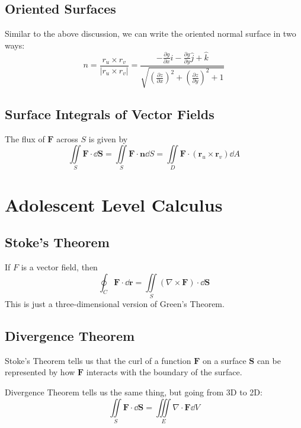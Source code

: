 \documentclass{article}
\begin{document}
\subsection{Oriented Surfaces}
Similar to the above discussion, we can write the oriented normal surface in two ways: 
\begin{equation}
    n =\frac{r_u \times r_v}{|r_u \times r_v|} = \frac{-\frac{\partial g}{\partial x} \hat{i} - \frac{\partial g}{\partial y}\hat{j} + \hat{k}}{\sqrt{\left(\frac{\partial z}{\partial x}\right)^2+\left(\frac{\partial z}{\partial y}\right)^2+1}}
\end{equation}
\subsection{Surface Integrals of Vector Fields}
The flux of $\bm{F}$ across $S$ is given by
\begin{equation}
    \iint\limits_S \bm{F} \cdot \dd{\bm{S}} = \iint\limits_S \bm{F} \cdot \bm{n} \dd{S} = \iint\limits_D \bm{F} \cdot (\bm{r}_u \times \bm{r}_v)\dd{A}
\end{equation}
\section{Adolescent Level Calculus}
\subsection{Stoke's Theorem}
If $F$ is a vector field, then 
\begin{equation}
    \oint_C \bm{F} \cdot \dd{\bm{r}} = \iint\limits_S \left(\nabla \times \bm{F} \right) \cdot \dd{\bm{S}}
\end{equation}
This is just a three-dimensional version of Green's Theorem.
\subsection{Divergence Theorem}
Stoke's Theorem tells us that the curl of a function $\bm{F}$ on a surface $\bm{S}$ can be represented by how $\bm{F}$ interacts with the boundary of the surface.

Divergence Theorem tells us the same thing, but going from 3D to 2D: 
\begin{equation}
    \iint\limits_S \bm{F} \cdot \dd{\bm{S}} = \iiint\limits_E \nabla \cdot \bm{F} \dd{V}
\end{equation}
\end{document}
